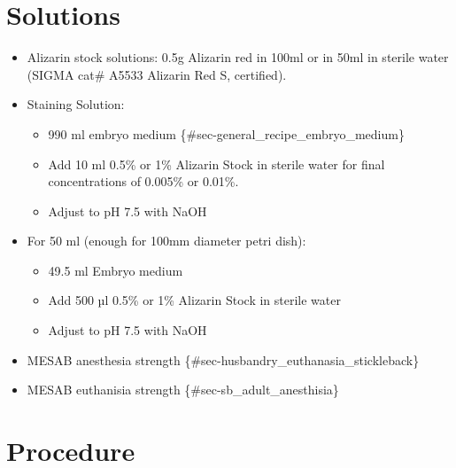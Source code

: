 \documentclass[
  letterpaper,
  DIV=11,
  numbers=noendperiod]{scrreprt}
\providecommand{\tightlist}{%
  \setlength{\itemsep}{0pt}\setlength{\parskip}{0pt}}\usepackage{longtable,booktabs,array}
\begin{document}
\hypertarget{solutions-65}{%
\section{Solutions}\label{solutions-65}}

\begin{itemize}
\tightlist
\item
  Alizarin stock solutions: 0.5g Alizarin red in 100ml or in 50ml in
  sterile water (SIGMA cat\# A5533 Alizarin Red S, certified).
\item
  Staining Solution:

  \begin{itemize}
  \tightlist
  \item
    990 ml embryo medium \{\#sec-general\_recipe\_embryo\_medium\}
  \item
    Add 10 ml 0.5\% or 1\% Alizarin Stock in sterile water for final
    concentrations of 0.005\% or 0.01\%.
  \item
    Adjust to pH 7.5 with NaOH
  \end{itemize}
\item
  For 50 ml (enough for 100mm diameter petri dish):

  \begin{itemize}
  \tightlist
  \item
    49.5 ml Embryo medium
  \item
    Add 500 µl 0.5\% or 1\% Alizarin Stock in sterile water
  \item
    Adjust to pH 7.5 with NaOH
  \end{itemize}
\item
  MESAB anesthesia strength \{\#sec-husbandry\_euthanasia\_stickleback\}
\item
  MESAB euthanisia strength \{\#sec-sb\_adult\_anesthisia\}
\end{itemize}

\hypertarget{procedure-72}{%
\section{Procedure}\label{procedure-72}}
\end{document}
